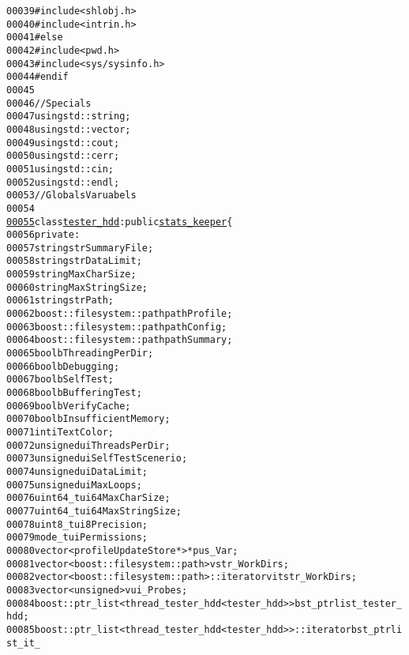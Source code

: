 \begin{footnotesize}
\begin{alltt}
00039 \textcolor{preprocessor}{#include <shlobj.h>}
00040 \textcolor{preprocessor}{#include <intrin.h>}
00041 \textcolor{preprocessor}{#else}
00042 \textcolor{preprocessor}{}\textcolor{preprocessor}{#include <pwd.h>}
00043 \textcolor{preprocessor}{#include <sys/sysinfo.h>}
00044 \textcolor{preprocessor}{#endif}
00045 \textcolor{preprocessor}{}
00046 \textcolor{comment}{//Specials}
00047 \textcolor{keyword}{using} std::string;
00048 \textcolor{keyword}{using} std::vector;
00049 \textcolor{keyword}{using} std::cout;
00050 \textcolor{keyword}{using} std::cerr;
00051 \textcolor{keyword}{using} std::cin;
00052 \textcolor{keyword}{using} std::endl;
00053 \textcolor{comment}{//Globals Varuabels}
00054 
\hypertarget{tester__hdd_8hpp_source_l00055}{}\hyperlink{classtester__hdd}{00055} \textcolor{keyword}{class }\hyperlink{classtester__hdd}{tester_hdd}: \textcolor{keyword}{public} \hyperlink{classstats__keeper}{stats_keeper}\{
00056     \textcolor{keyword}{private}:
00057         \textcolor{keywordtype}{string} strSummaryFile; 
00058         \textcolor{keywordtype}{string} strDataLimit; 
00059         \textcolor{keywordtype}{string} MaxCharSize; 
00060         \textcolor{keywordtype}{string} MaxStringSize; 
00061         \textcolor{keywordtype}{string} strPath;
00062         boost::filesystem::path pathProfile;
00063         boost::filesystem::path pathConfig;
00064         boost::filesystem::path pathSummary;
00065         \textcolor{keywordtype}{bool} bThreadingPerDir; 
00066         \textcolor{keywordtype}{bool} bDebugging; 
00067         \textcolor{keywordtype}{bool} bSelfTest;
00068         \textcolor{keywordtype}{bool} bBufferingTest;
00069         \textcolor{keywordtype}{bool} bVerifyCache;
00070         \textcolor{keywordtype}{bool} bInsufficientMemory;
00071         \textcolor{keywordtype}{int} iTextColor;
00072         \textcolor{keywordtype}{unsigned} uiThreadsPerDir; 
00073         \textcolor{keywordtype}{unsigned} uiSelfTestScenerio; 
00074         \textcolor{keywordtype}{unsigned} uiDataLimit; 
00075         \textcolor{keywordtype}{unsigned} uiMaxLoops;
00076         uint64\_t ui64MaxCharSize;
00077         uint64\_t ui64MaxStringSize;
00078         uint8\_t ui8Precision;
00079         mode\_t uiPermissions; 
00080         vector<profileUpdateStore*> *pus\_Var;
00081         vector<boost::filesystem::path> vstr\_WorkDirs; 
00082         vector<boost::filesystem::path>::iterator vitstr\_WorkDirs; 
00083         vector<unsigned> vui\_Probes;
00084         boost::ptr\_list<thread\_tester\_hdd<tester\_hdd> > bst\_ptrlist\_tester\_hdd; 
00085         boost::ptr\_list<thread\_tester\_hdd<tester\_hdd> >::iterator bst\_ptrlist\_it\_

\end{alltt}
\end{footnotesize}

